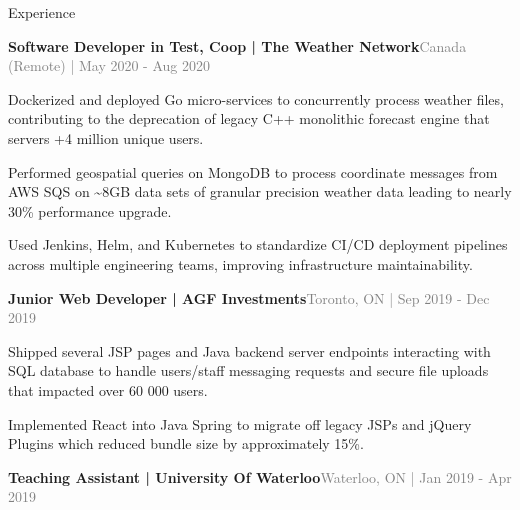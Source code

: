 \documentclass[hidelinks]{resume} %
\begin{document}
\begin{rSection}{Experience}
\begin{rSubsection}{\textbf{Software Developer in Test, Coop | The Weather Network}}{\textcolor{gray}{\small Canada (Remote) | May 2020 - Aug 2020}}{}
        \begin{bulletpoints}
            \vspace{-.10cm}
            \item Dockerized and deployed Go micro-services to concurrently process weather files, contributing to the deprecation of legacy C++ monolithic forecast engine that servers +4 million unique users.
             \vspace{-.13cm}
            \item Performed geospatial queries on MongoDB to process coordinate messages from AWS SQS on \textasciitilde 8GB data sets of granular precision weather data leading to nearly 30\% performance upgrade.
            \vspace{-.13cm}
             \item Used Jenkins, Helm, and Kubernetes to standardize CI/CD deployment pipelines across multiple engineering teams, improving infrastructure maintainability.
             \vspace{-.10cm}
        \end{bulletpoints}
\end{rSubsection}
\begin{rSubsection}{\textbf{Junior Web Developer | AGF Investments}}{\textcolor{gray}{\small Toronto, ON | Sep 2019 - Dec 2019}}{}
        \par
        \begin{bulletpoints}
            \vspace{-.10cm}
            \item Shipped several JSP pages and Java backend server endpoints interacting with SQL database to handle users/staff messaging requests and secure file uploads that impacted over 60 000 users.
            \vspace{-.13cm}
            \item Implemented React into Java Spring to migrate off legacy JSPs and jQuery Plugins which reduced bundle size by approximately 15\%.
             \vspace{-.10cm}
        \end{bulletpoints}
\end{rSubsection}
\begin{rSubsection}{\textbf{Teaching Assistant | University Of Waterloo}}{\textcolor{gray}{\small Waterloo, ON | Jan 2019 - Apr 2019}}{}


\end{rSubsection}
\end{rSection}
\end{document}
